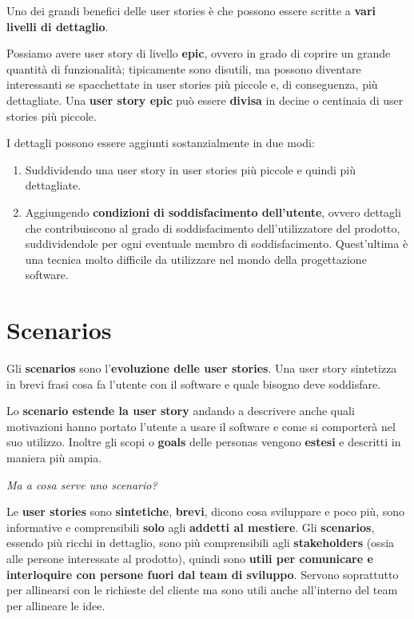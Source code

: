 Uno dei grandi benefici delle user stories è che possono essere
scritte a \textbf{vari livelli di dettaglio}.

Possiamo avere user story di livello \textbf{epic}, ovvero in grado di coprire un grande quantità di funzionalità; tipicamente sono disutili, ma
possono diventare interessanti se spacchettate in user stories più piccole e, di conseguenza, più dettagliate. Una \textbf{user story epic} può
essere \textbf{divisa} in decine o centinaia di user stories più piccole.

I dettagli possono essere aggiunti sostanzialmente in due modi:
\begin{enumerate}
	\itemsep-0.3em
	\item Suddividendo una user story in user stories più piccole e quindi più dettagliate.
	\item Aggiungendo \textbf{condizioni di soddisfacimento dell'utente}, ovvero dettagli che contribuiscono al grado di soddisfacimento
	dell'utilizzatore del prodotto, suddividendole per ogni eventuale membro di soddisfacimento. Quest'ultima è una tecnica molto difficile da
	utilizzare nel mondo della progettazione software.
\end{enumerate}

\section{Scenarios}

Gli \textbf{scenarios} sono l'\textbf{evoluzione delle user stories}. Una user story sintetizza in brevi frasi cosa fa l'utente con il software e
quale bisogno deve soddisfare.

Lo \textbf{scenario estende la user story} andando a descrivere anche quali motivazioni hanno portato l'utente a usare il software e come si
comporterà nel suo utilizzo. Inoltre gli scopi o \textbf{goals} delle personas vengono \textbf{estesi} e descritti in maniera più ampia.

\begin{flushleft}
	\textit{Ma a cosa serve uno scenario?}
\end{flushleft}

Le \textbf{user stories} sono \textbf{sintetiche}, \textbf{brevi}, dicono cosa sviluppare e poco più, sono informative e comprensibili
\textbf{solo} agli \textbf{addetti al mestiere}. Gli \textbf{scenarios}, essendo più ricchi in dettaglio, sono più comprensibili agli
\textbf{stakeholders} (ossia alle persone interessate al prodotto), quindi sono \textbf{utili per comunicare e interloquire con persone fuori dal
team di sviluppo}. Servono soprattutto per allinearsi con le richieste del cliente ma sono  utili anche all'interno del team per allineare le idee.

